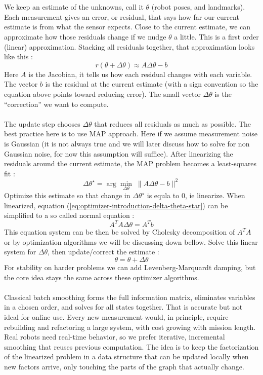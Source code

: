 \\ \\
We keep an estimate of the unknowns, call it $\theta$ (robot poses, and landmarks). Each measurement gives an error, or residual, that says how far our current estimate is from what the sensor expects. Close to the current estimate, we can approximate how those residuals change if we nudge $\theta$ a little. This is a first order (linear) approximation. Stacking all residuals together, that approximation looks like this \cite{iSAM_paper}:
$$
    r(\theta + \Delta\theta) \approx A\Delta\theta - b
$$
Here $A$ is the Jacobian, it tells us how each residual changes with each variable. The vector $b$ is the residual at the current estimate (with a sign convention so the equation above points toward reducing error). The small vector $\Delta\theta$ is the ``correction'' we want to compute. \cite{iSAM_paper}
\\ \\
The update step chooses $\Delta\theta$ that reduces all residuals as much as possible. The best practice here is to use MAP approach. Here if we assume measurement noise is Gaussian (it is not always true and we will later discuss how to solve for non Gaussian noise, for now this assumption will suffice). After linearizing the residuals around the current estimate, the MAP problem becomes a least-squares fit \cite{iSAM_paper}:
\begin{equation}
    \Delta\theta^\star = \arg\min_{\Delta\theta}\; \|A\Delta\theta - b\|^2
    \label{eq:optimizer-introduction-delta-theta-star}
\end{equation}
Optimize this estimate so that change in $\Delta\theta^\star$ is equla to 0, ie linearize. When linearized, equation (\ref{eq:optimizer-introduction-delta-theta-star}) can be simplified to a so called normal equation \cite{iSAM_paper}:
$$
    A^{T}A\Delta\theta = A^{T}b
$$
This equation system can be then be solved by Cholesky decomposition of $A^{T}A$ or by optimization algorithms we will be discussing down bellow. Solve this linear system for $\Delta\theta$, then update/correct the estimate \cite{iSAM_paper}:
$$
    \theta = \theta + \Delta\theta
$$
For stability on harder problems we can add Levenberg-Marquardt damping, but the core idea stays the same across these optimizer algorithms. \cite{iSAM2_paper}
\\ \\
Classical batch smoothing forms the full information matrix, eliminates variables in a chosen order, and solves for all states together. That is accurate but not ideal for online use. Every new measurement would, in principle, require rebuilding and refactoring a large system, with cost growing with mission length. Real robots need real-time behavior, so we prefer iterative, incremental smoothing that reuses previous computation. The idea is to keep the factorization of the linearized problem in a data structure that can be updated locally when new factors arrive, only touching the parts of the graph that actually change.
